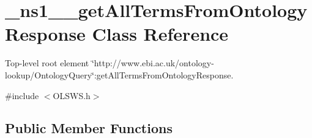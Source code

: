 \hypertarget{class__ns1____getAllTermsFromOntologyResponse}{
\section{\_\-ns1\_\-\_\-getAllTermsFromOntologyResponse Class Reference}
\label{class__ns1____getAllTermsFromOntologyResponse}
}


Top-\/level root element \char`\"{}http://www.ebi.ac.uk/ontology-\/lookup/OntologyQuery\char`\"{}:getAllTermsFromOntologyResponse.  




{\ttfamily \#include $<$OLSWS.h$>$}

\subsection*{Public Member Functions}
